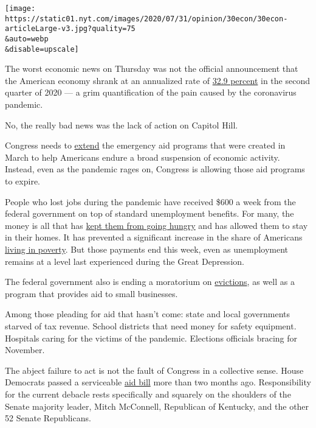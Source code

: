 \texttt{[image: https://static01.nyt.com/images/2020/07/31/opinion/30econ/30econ-articleLarge-v3.jpg?quality=75\\\&auto=webp\\\&disable=upscale]}

The worst economic news on Thursday was not the official announcement
that the American economy shrank at an annualized rate of
\href{https://www.nytimes.com/live/2020/07/30/business/stock-market-today-coronavirus?action=click\&module=Top\%20Stories\&pgtype=Homepage}{32.9
percent} in the second quarter of 2020 --- a grim quantification of the
pain caused by the coronavirus pandemic.

No, the really bad news was the lack of action on Capitol Hill.

Congress needs to
\href{https://www.nytimes.com/2020/03/27/us/politics/coronavirus-house-voting.html}{extend}
the emergency aid programs that were created in March to help Americans
endure a broad suspension of economic activity. Instead, even as the
pandemic rages on, Congress is allowing those aid programs to expire.

People who lost jobs during the pandemic have received \$600 a week from
the federal government on top of standard unemployment benefits. For
many, the money is all that has
\href{https://www.msn.com/en-us/finance/markets/almost-30-million-in-us-didn-e2-80-99t-have-enough-to-eat-last-week/ar-BB17ldBN}{kept
them from going hungry} and has allowed them to stay in their homes. It
has prevented a significant increase in the share of Americans
\href{https://www.nytimes.com/2020/06/21/us/politics/coronavirus-poverty.html}{living
in poverty}. But those payments end this week, even as unemployment
remains at a level last experienced during the Great Depression.

The federal government also is ending a moratorium on
\href{https://www.nytimes.com/2020/07/23/opinion/coronavirus-evictions-rent.html}{evictions},
as well as a program that provides aid to small businesses.

Among those pleading for aid that hasn't come: state and local
governments starved of tax revenue. School districts that need money for
safety equipment. Hospitals caring for the victims of the pandemic.
Elections officials bracing for November.

The abject failure to act is not the fault of Congress in a collective
sense. House Democrats passed a serviceable
\href{https://www.nytimes.com/2020/05/15/us/politics/house-simulus-vote.html}{aid
bill} more than two months ago. Responsibility for the current debacle
rests specifically and squarely on the shoulders of the Senate majority
leader, Mitch McConnell, Republican of Kentucky, and the other 52 Senate
Republicans.

